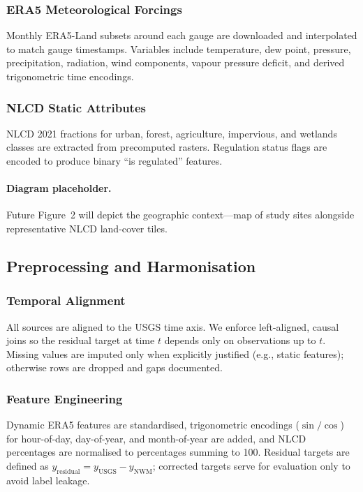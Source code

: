 \documentclass[draft]{agujournal2019}
\begin{document}
\subsubsection{ERA5 Meteorological Forcings}
Monthly ERA5-Land subsets around each gauge are downloaded and interpolated to match gauge timestamps. Variables include temperature, dew point, pressure, precipitation, radiation, wind components, vapour pressure deficit, and derived trigonometric time encodings.

\subsubsection{NLCD Static Attributes}
NLCD 2021 fractions for urban, forest, agriculture, impervious, and wetlands classes are extracted from precomputed rasters. Regulation status flags are encoded to produce binary “is regulated” features.

\paragraph{Diagram placeholder.} Future Figure~2 will depict the geographic context—map of study sites alongside representative NLCD land-cover tiles.

\subsection{Preprocessing and Harmonisation}
\subsubsection{Temporal Alignment}
All sources are aligned to the USGS time axis. We enforce left-aligned, causal joins so the residual target at time \(t\) depends only on observations up to \(t\). Missing values are imputed only when explicitly justified (e.g., static features); otherwise rows are dropped and gaps documented.

\subsubsection{Feature Engineering}
Dynamic ERA5 features are standardised, trigonometric encodings (\(\sin/\cos\)) for hour-of-day, day-of-year, and month-of-year are added, and NLCD percentages are normalised to percentages summing to 100. Residual targets are defined as \(y_{\text{residual}} = y_{\text{USGS}} - y_{\text{NWM}}\); corrected targets serve for evaluation only to avoid label leakage.
\end{document}

